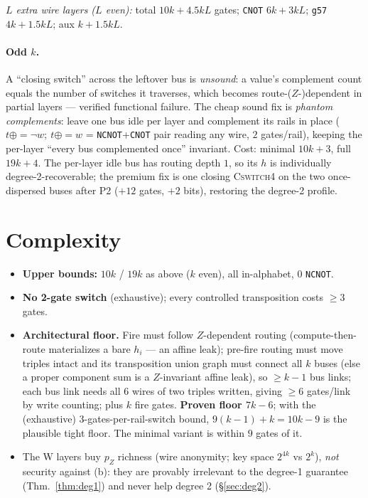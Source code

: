 \documentclass[11pt]{article}
\theoremstyle{remark}
\newcommand{\g}{\texttt{g57}}
\newcommand{\CNOT}{\texttt{CNOT}}
\newcommand{\NCNOT}{\texttt{NCNOT}}
\newcommand{\CSW}{\textsc{Cswitch4}}
\begin{document}
\emph{$L$ extra wire layers ($L$ even):} total $10k+4.5kL$ gates; \CNOT{} $6k+3kL$;
\g{} $4k+1.5kL$; aux $k+1.5kL$.

\paragraph{Odd $k$.} A ``closing switch'' across the leftover bus is \emph{unsound}: a value's
complement count equals the number of switches it traverses, which becomes route-($Z$-)dependent
in partial layers --- verified functional failure. The cheap sound fix is \emph{phantom
complements}: leave one bus idle per layer and complement its rails in place
($t\mathrel{\oplus{=}}\neg w;\ t\mathrel{\oplus{=}}w$ = \NCNOT+\CNOT{} pair reading any wire,
$2$ gates/rail), keeping the per-layer ``every bus complemented once'' invariant. Cost: minimal
$10k{+}3$, full $19k{+}4$. The per-layer idle bus has routing depth $1$, so its $h$ is
individually degree-2-recoverable; the premium fix is one closing \CSW{} on the two
once-dispersed buses after P2 ($+12$ gates, $+2$ bits), restoring the degree-2 profile.

\section{Complexity}

\begin{itemize}
\item \textbf{Upper bounds:} $10k$ / $19k$ as above ($k$ even), all in-alphabet, $0$ \NCNOT.
\item \textbf{No 2-gate switch} (exhaustive); every controlled transposition costs $\ge3$ gates.
\item \textbf{Architectural floor.} Fire must follow $Z$-dependent routing (compute-then-route
materializes a bare $h_i$ --- an affine leak); pre-fire routing must move triples intact and its
transposition union graph must connect all $k$ buses (else a proper component sum is a
$Z$-invariant affine leak), so $\ge k-1$ bus links; each bus link needs all $6$ wires of two
triples written, giving $\ge6$ gates/link by write counting; plus $k$ fire gates.
\textbf{Proven floor $7k-6$}; with the (exhaustive) 3-gates-per-rail-switch bound,
$9(k-1)+k=10k-9$ is the plausible tight floor. The minimal variant is within $9$ gates of it.
\item The W layers buy $p_Z$ richness (wire anonymity; key space $2^{4k}$ vs $2^{k}$),
\emph{not} security against (b): they are provably irrelevant to the degree-1 guarantee
(Thm.~\ref{thm:deg1}) and never help degree 2 (\S\ref{sec:deg2}).
\end{itemize}
\end{document}
